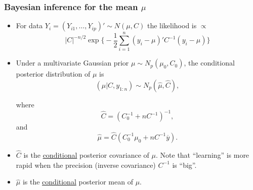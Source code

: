 \documentclass[handout]{beamer}
\begin{document}



 
\begin{frame}
\frametitle{Bayesian inference for the mean $\mu$}
\begin{itemize}[<+-| alert@+>]
\item For data $Y_i = (Y_{i1},\ldots,Y_{ip})' \sim N( \mu, C)$ the likelihood is $\propto$
$$|C|^{-n/2}\exp\bigg\{ -\frac{1}{2}\sum_{i=1}^n (y_i - \mu)' C^{-1}(y_i - \mu) \bigg\}$$

\item Under a multivariate Gaussian prior $\mu \sim N_p( \mu_0, C_0 )$, the conditional 
posterior distribution of $\mu$ is 
$$( \mu | C, y_{1:n}) \sim N_p( \hat{\mu}, \hat{C}),$$

where
$$\hat{C} = (C_0^{-1} + n C^{-1})^{-1},$$ 
and
$$\hat{\mu}=\hat{C}( C_0^{-1}\mu_0 + n C^{-1}\overline{y} ).$$

\item $\hat{C}$ is the \underline{conditional} posterior covariance of $\mu$. Note that 
    ``learning'' is more rapid when the precision (inverse covariance) $C^{-1}$ is ``big''.

\item $\hat{\mu}$ is the \underline{conditional} posterior mean of $\mu$.
\end{itemize}
\end{frame}
\end{document}
